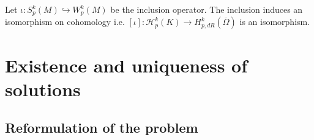 \documentclass[12pt,a4paper]{article}
\theoremstyle{definition}
\newcommand{\aop}{\mathscr{A}}
\newcommand{\lpcoho}{H^k_{p,dR}}
\newcommand{\omegabar}{\overline{\Omega}}
\newcommand{\rop}{\mathscr{R}} %
\begin{document}
Let 
$\iota: S^k_p(M) \hookrightarrow W^k_p(M)$ be the inclusion operator. 
The inclusion induces an
isomorphism on cohomology \cite[Lemma 4, Corollary]{goldshtein} i.e. 
$[\iota]: \mathscr{H}_p^k(K) \rightarrow \lpcoho(\omegabar)$ is an isomorphism. 








\section{Existence and uniqueness of solutions}

\subsection{Reformulation of the problem} 
\end{document}
